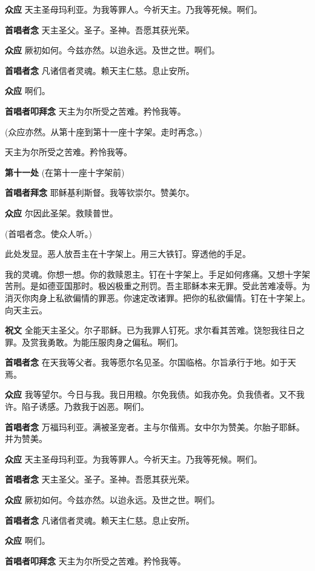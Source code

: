 \documentclass[UTF8,17pt]{ctexart}
\begin{document}
\textbf{众应} \quad 天主圣母玛利亚。为我等罪⼈。今祈天主。乃我等死候。啊们。

\textbf{⾸唱者念} \quad 天主圣⽗。圣⼦。圣神。吾愿其获光荣。

\textbf{众应} \quad 厥初如何。今兹亦然。以迨永远。及世之世。啊们。

\textbf{⾸唱者念} \quad 凡诸信者灵魂。赖天主仁慈。息⽌安所。

\textbf{众应} \quad 啊们。


\textbf{⾸唱者叩拜念} \quad 天主为尔所受之苦难。矜怜我等。

(众应亦然。从第十座到第十一座⼗字架。⾛时再念。)

天主为尔所受之苦难。矜怜我等。

\textbf{第十一处} (在第十一座⼗字架前)

\textbf{⾸唱者拜念} \quad 耶稣基利斯督。我等钦崇尔。赞美尔。

\textbf{众应} \quad 尔因此圣架。救赎普世。

(⾸唱者念。使众⼈听。)

此处发显。恶⼈放吾主在⼗字架上。⽤三⼤铁钉。穿透他的⼿⾜。

我的灵魂。你想⼀想。你的救赎恩主。钉在⼗字架上。⼿⾜如何疼痛。又想⼗字架苦刑。是如德亚国那时。极凶极重之刑罚。吾主耶稣本来⽆罪。受此苦难凌辱。为消灭你⾁⾝上私欲偏情的罪恶。你速定改诸罪。把你的私欲偏情。钉在⼗字架上。向天主云。

\textbf{祝⽂} \quad 全能天主圣⽗。尔⼦耶稣。已为我罪⼈钉死。求尔看其苦难。饶恕我往⽇之罪。及赏我勇敢。为能压服⾁⾝之偏私。啊们。

\textbf{⾸唱者念} \quad 在天我等⽗者。我等愿尔名见圣。尔国临格。尔旨承⾏于地。如于天焉。

\textbf{众应} \quad 我等望尔。今⽇与我。我⽇⽤粮。尔免我债。如我亦免。负我债者。又不我许。陷⼦诱感。乃救我于凶恶。啊们。

\textbf{⾸唱者念} \quad 万福玛利亚。满被圣宠者。主与尔偕焉。⼥中尔为赞美。尔胎⼦耶稣。并为赞美。

\textbf{众应} \quad 天主圣母玛利亚。为我等罪⼈。今祈天主。乃我等死候。啊们。

\textbf{⾸唱者念} \quad 天主圣⽗。圣⼦。圣神。吾愿其获光荣。

\textbf{众应} \quad 厥初如何。今兹亦然。以迨永远。及世之世。啊们。

\textbf{⾸唱者念} \quad 凡诸信者灵魂。赖天主仁慈。息⽌安所。

\textbf{众应} \quad 啊们。


\textbf{⾸唱者叩拜念} \quad 天主为尔所受之苦难。矜怜我等。
\end{document}
